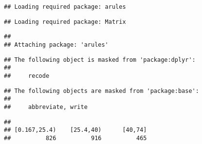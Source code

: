 \documentclass[
]{article}
\newenvironment{Shaded}{\begin{snugshade}}{\end{snugshade}}
\newcommand{\AttributeTok}[1]{\textcolor[rgb]{0.80,0.80,0.80}{#1}}
\newcommand{\ConstantTok}[1]{\textcolor[rgb]{0.86,0.64,0.64}{\textbf{#1}}}
\newcommand{\DecValTok}[1]{\textcolor[rgb]{0.86,0.86,0.80}{#1}}
\newcommand{\FunctionTok}[1]{\textcolor[rgb]{0.94,0.94,0.56}{#1}}
\newcommand{\NormalTok}[1]{\textcolor[rgb]{0.80,0.80,0.80}{#1}}
\newcommand{\SpecialCharTok}[1]{\textcolor[rgb]{0.86,0.64,0.64}{#1}}
\newcommand{\StringTok}[1]{\textcolor[rgb]{0.80,0.58,0.58}{#1}}
\begin{document}
\begin{verbatim}
## Loading required package: arules
\end{verbatim}

\begin{verbatim}
## Loading required package: Matrix
\end{verbatim}

\begin{verbatim}
## 
## Attaching package: 'arules'
\end{verbatim}

\begin{verbatim}
## The following object is masked from 'package:dplyr':
## 
##     recode
\end{verbatim}

\begin{verbatim}
## The following objects are masked from 'package:base':
## 
##     abbreviate, write
\end{verbatim}

\begin{Shaded}
\end{Shaded}

\begin{verbatim}
## 
## [0.167,25.4)    [25.4,40)      [40,74] 
##          826          916          465
\end{verbatim}

\begin{Shaded}
\end{Shaded}
\end{document}
